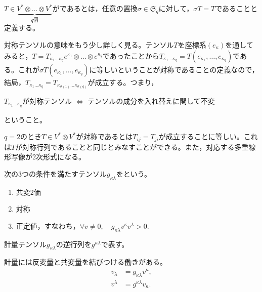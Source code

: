 \documentclass[uplatex]{jsarticle}
\begin{document}
\begin{teigi}[対称テンソル]
  $T \in \underbrace{V^{*} \otimes \dots \otimes V^{*}}_{q\text{個}}$がであるとは，任意の置換$\sigma \in \mathfrak{S}_{q}$に対して，$\sigma T = T$であることと定義する。
\end{teigi}

対称テンソルの意味をもう少し詳しく見る。テンソル$T$を座標系$(e_{\kappa})$を通してみると，$T = T_{\kappa_{1} \dots \kappa_{q}} e^{\kappa_{1}} \otimes \dots \otimes e^{\kappa_{q}}$であったことから$T_{\kappa_{1} \dots \kappa_{q}} = T(e_{\kappa_{1}}, \dots, e_{\kappa_{q}})$である。これが$\sigma T (e_{\kappa_{1}}, \dots, e_{\kappa_{q}})$に等しいということが対称であることの定義なので，結局，$T_{\kappa_{1} \dots \kappa_{q}} = T_{\kappa_{\sigma(1)}\dots \kappa_{\sigma(q)}}$が成立する。つまり，
\begin{center}
  $T_{\kappa_{1}\dots\kappa_{q}}$が対称テンソル $\iff$ テンソルの成分を入れ替えに関して不変
\end{center}
ということ。

\begin{rei}
  $q = 2$のとき$T \in V^{*} \otimes V^{*}$が対称であるとは$T_{ij} = T_{ji}$が成立することに等しい。これは$T$が対称行列であることと同じとみなすことができる。また，対応する多重線形写像が2次形式になる。
\end{rei}


\sukima{}\par
\begin{teigi}[計量テンソル]
  次の3つの条件を満たすテンソル$g_{\kappa\lambda}$をという。
  \begin{enumerate}
    \item 共変2価
    \item 対称
    \item 正定値，すなわち，$\forall v \neq 0, \quad g_{\kappa\lambda}v^{\kappa}v^{\lambda} > 0.$
  \end{enumerate}
\end{teigi}

\begin{teigi}
  計量テンソル$g_{\kappa\lambda}$の逆行列を$g^{\kappa\lambda}$で表す。
\end{teigi}

\begin{remark}
  計量には反変量と共変量を結びつける働きがある。
  \begin{align}
    v_{\lambda} &= g_{\kappa \lambda} v^{\kappa}, \\
    v^{\lambda} &= g^{\kappa \lambda} v_{\kappa}.
  \end{align}
\end{remark}
\end{document}
